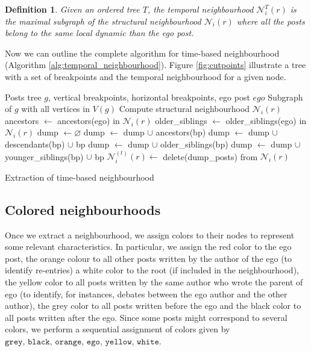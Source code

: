 \documentclass[conference]{IEEEtran}
\newtheorem{definition}{Definition}
\begin{document}
\begin{definition}
Given an ordered tree $T$, the temporal neighbourhood $\mathcal{N}_{i}^T(r)$ is the maximal subgraph of the structural neighbourhood $\mathcal{N}_i(r)$ where all the posts belong to the same local dynamic than the ego post.
\end{definition}
Now we can outline the complete algorithm for time-based neighbourhood (Algorithm \ref{alg:temporal_neighbourhood}). Figure \ref{fig:cutpoints} illustrate a tree with a set of breakpoints and the temporal neighbourhood for a given node.
\begin{algorithm}[H]
\begin{algorithmic}
\REQUIRE Posts tree $g$, vertical breakpoints, horizontal breakpoints, ego post $ego$
\ENSURE Subgraph of $g$ with all vertices in $V(g)$
\STATE Compute structural neighbourhood $\mathcal{N}_i(r)$
\STATE ancestors $\leftarrow$  ancestors(ego) in $\mathcal{N}_i(r)$
\STATE older\_siblings $\leftarrow$ older\_siblings(ego) in $\mathcal{N}_i(r)$
\STATE dump $\leftarrow \varnothing$
   \STATE dump $\leftarrow$ dump $\cup$ ancestors(bp)
 \ELSE
   \STATE dump $\leftarrow$ dump $\cup$ descendants(bp) $\cup$ bp
  \ENDIF
\ENDFOR
{}
     \STATE dump $\leftarrow$ dump $\cup$ older\_siblings(bp)
   \ELSE
     \STATE dump $\leftarrow$ dump $\cup$ younger\_siblings(bp) $\cup$ bp
  \ENDIF
\ENDFOR
\STATE $\mathcal{N}_i^{(t)}(r) \leftarrow$ delete(dump\_posts) from $\mathcal{N}_i(r)$
\end{algorithmic}
\caption{Extraction of time-based neighbourhood}
\label{alg:temporal_neighbourhood}
\end{algorithm}

\subsection{Colored neighbourhoods}
Once we extract a neighbourhood, we assign colors to their nodes to represent some relevant characteristics. In particular, we assign the red color to the ego post, the orange colour to all other posts written by the author of the ego (to identify re-entries) a white color to the root (if included in the neighbourhood), the yellow color to all posts written by the same author who wrote the parent of ego (to identify, for instances, debates between the ego author and the other author), the grey color to all posts written before the ego and the black color to all posts written after the ego. Since some posts might correspond to several colors, we perform a sequential assignment of colors given by $\texttt{grey, black, orange, ego, yellow, white}$.
\end{document}
